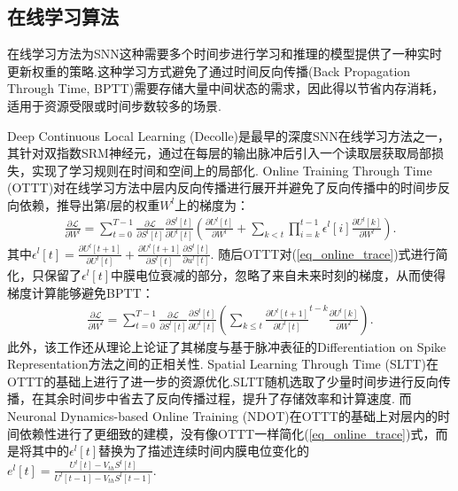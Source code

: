 \documentclass{SCIS2020cn}
\begin{document}
\subsection{在线学习算法}%

在线学习方法为SNN这种需要多个时间步进行学习和推理的模型提供了一种实时更新权重的策略.这种学习方式避免了通过时间反向传播(Back Propagation Through Time, BPTT)需要存储大量中间状态的需求，因此得以节省内存消耗，适用于资源受限或时间步数较多的场景.

Deep Continuous Local Learning (Decolle)\cite{kaiser2020synaptic}是最早的深度SNN在线学习方法之一，其针对双指数SRM神经元，通过在每层的输出脉冲后引入一个读取层获取局部损失，实现了学习规则在时间和空间上的局部化.
Online Training Through Time (OTTT)\cite{xiao2022online}对在线学习方法中层内反向传播进行展开并避免了反向传播中的时间步反向依赖，推导出第$l$层的权重$W^{l}$上的梯度为：
\begin{align}
    \frac{\partial \mathcal{L}}{\partial W^l} = \sum_{t=0}^{T-1} \frac{\partial \mathcal{L}}{\partial S^l[t]} \frac{\partial S^l[t]}{\partial U^l[t]} \left( \frac{\partial U^l[t]}{\partial W^l} + \sum_{k < t} \prod_{i=k}^{t-1} \epsilon^l[i] \frac{\partial U^l[k]}{\partial W^l} \right). \label{eq_online_trace}
\end{align}
其中$ \epsilon^l[t] = \frac{\partial U^l[t+1]}{\partial U^l[t]} + \frac{\partial U^l[t+1]}{\partial  S^l[t]} \frac{\partial  S^l[t]}{\partial u^l[t]}$.
随后OTTT对(\ref{eq_online_trace})式进行简化，只保留了$ \epsilon^l[t]$中膜电位衰减的部分，忽略了来自未来时刻的梯度，从而使得梯度计算能够避免BPTT：
\begin{align}
    \frac{\partial \mathcal{L}}{\partial W^l} = \sum_{t=0}^{T-1} \frac{\partial \mathcal{L}}{\partial S^l[t]} \frac{\partial S^l[t]}{\partial U^l[t]} \left( \sum_{k \leq t} \frac{\partial U^l[t+1]}{\partial U^l[t]}^{t-k} \frac{\partial U^l[k]}{\partial W^l} \right).
\end{align}
此外，该工作还从理论上论证了其梯度与基于脉冲表征的Differentiation on Spike Representation方法\cite{meng2022training}之间的正相关性.
Spatial Learning Through Time (SLTT)\cite{meng2023towards}在OTTT的基础上进行了进一步的资源优化.SLTT随机选取了少量时间步进行反向传播，在其余时间步中省去了反向传播过程，提升了存储效率和计算速度.
而Neuronal Dynamics-based Online Training (NDOT)\cite{jiang2024ndot}在OTTT的基础上对层内的时间依赖性进行了更细致的建模，没有像OTTT一样简化(\ref{eq_online_trace})式，而是将其中的$ \epsilon^l[t]$替换为了描述连续时间内膜电位变化的$e^l[t] = \frac{ U^l[t] - V_{th} S^l[t]}{ U^l[t-1] - V_{th}  S^l[t-1]}$.
\end{document}

